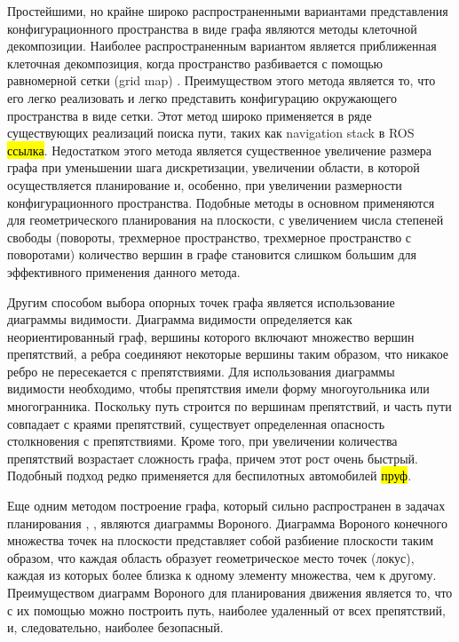 Простейшими, но крайне широко распространенными вариантами представления конфигурационного пространства
в виде графа являются методы клеточной декомпозиции. Наиболее распространенным вариантом является приближенная клеточная
декомпозиция, когда пространство разбивается с помощью равномерной сетки (grid map)
\cite{motion_planning_overview_obstacles}. Преимуществом этого метода является то, что его легко реализовать и легко
представить конфигурацию окружающего пространства в виде сетки. Этот метод широко применяется в ряде существующих
реализаций поиска пути, таких как navigation stack в ROS \hl{ссылка}. Недостатком этого метода является существенное
увеличение размера графа при уменьшении шага дискретизации, увеличении области, в которой осуществляется планирование и,
особенно, при увеличении размерности  конфигурационного пространства. Подобные методы в основном применяются для
геометрического планирования на плоскости, с увеличением числа степеней свободы (повороты, трехмерное пространство,
трехмерное пространство с поворотами) количество вершин в графе становится слишком большим для эффективного применения
данного метода.

Другим способом выбора опорных точек графа является использование диаграммы видимости.
\cite{motion_planning_overview_obstacles} Диаграмма видимости определяется как неориентированный граф, вершины которого
включают множество вершин препятствий, а ребра соединяют некоторые вершины таким образом, что никакое ребро не
пересекается с препятствиями. Для использования диаграммы видимости необходимо, чтобы препятствия имели форму
многоугольника или многогранника. Поскольку путь строится по вершинам препятствий, и часть пути совпадает с краями
препятствий, существует определенная опасность столкновения с препятствиями. Кроме того, при увеличении количества
препятствий возрастает сложность графа, причем этот рост очень быстрый. Подобный подход редко применяется для
беспилотных автомобилей \hl{пруф}.

Еще одним методом построение графа, который сильно распространен в задачах планирования \cite{darpa_annieway_navigation},
\cite{motion_planning_overview_obstacles}, являются диаграммы Вороного. Диаграмма Вороного конечного множества точек на
плоскости представляет собой разбиение плоскости таким образом, что каждая область образует геометрическое место точек
(локус), каждая из которых более близка к одному элементу множества, чем к другому. Преимуществом диаграмм Вороного для
планирования движения является то, что с их помощью можно построить путь, наиболее удаленный от всех препятствий, и,
следовательно, наиболее безопасный.

